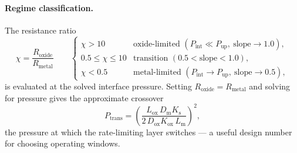 \documentclass[11pt,a4paper]{article}
\newcommand{\Pup}{P_{\mathrm{up}}}
\newcommand{\Pint}{P_{\mathrm{int}}}
\newcommand{\Ks}{K_{\mathrm{s}}}
\newcommand{\Kox}{K_{\mathrm{ox}}}
\newcommand{\Dm}{D_{\mathrm{m}}}
\newcommand{\Dox}{D_{\mathrm{ox}}}
\newcommand{\Lm}{L_{\mathrm{m}}}
\newcommand{\Lox}{L_{\mathrm{ox}}}
\newcommand{\Rox}{R_{\mathrm{oxide}}}
\newcommand{\Rmet}{R_{\mathrm{metal}}}
\begin{document}
\paragraph{Regime classification.} The resistance ratio
\begin{equation}
  \chi = \frac{\Rox}{\Rmet}
  \qquad
  \begin{cases}
    \chi > 10 & \text{oxide-limited } (\Pint \ll \Pup,\ \text{slope} \to 1.0),\\[2pt]
    0.5 \le \chi \le 10 & \text{transition } (0.5 < \text{slope} < 1.0),\\[2pt]
    \chi < 0.5 & \text{metal-limited } (\Pint \to \Pup,\ \text{slope} \to 0.5),
  \end{cases}
  \label{eq:chi}
\end{equation}
is evaluated at the solved interface pressure. Setting $\Rox = \Rmet$ and
solving for pressure gives the approximate crossover
\begin{equation}
  P_{\mathrm{trans}} = \left(\frac{\Lox\, \Dm \Ks}{2\, \Dox \Kox\, \Lm}\right)^{2},
  \label{eq:Ptrans}
\end{equation}
the pressure at which the rate-limiting layer switches --- a useful design
number for choosing operating windows.
\end{document}
